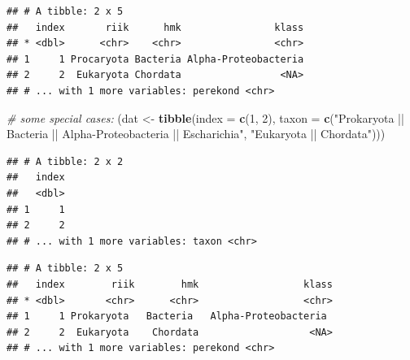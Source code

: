 \documentclass[]{book}
\newenvironment{Shaded}{\begin{snugshade}}{\end{snugshade}}
\newcommand{\KeywordTok}[1]{\textcolor[rgb]{0.13,0.29,0.53}{\textbf{#1}}}
\newcommand{\DataTypeTok}[1]{\textcolor[rgb]{0.13,0.29,0.53}{#1}}
\newcommand{\DecValTok}[1]{\textcolor[rgb]{0.00,0.00,0.81}{#1}}
\newcommand{\CharTok}[1]{\textcolor[rgb]{0.31,0.60,0.02}{#1}}
\newcommand{\StringTok}[1]{\textcolor[rgb]{0.31,0.60,0.02}{#1}}
\newcommand{\CommentTok}[1]{\textcolor[rgb]{0.56,0.35,0.01}{\textit{#1}}}
\newcommand{\OperatorTok}[1]{\textcolor[rgb]{0.81,0.36,0.00}{\textbf{#1}}}
\newcommand{\NormalTok}[1]{#1}
\begin{document}
\begin{verbatim}
## # A tibble: 2 x 5
##   index       riik      hmk                klass
## * <dbl>      <chr>    <chr>                <chr>
## 1     1 Procaryota Bacteria Alpha-Proteobacteria
## 2     2  Eukaryota Chordata                 <NA>
## # ... with 1 more variables: perekond <chr>
\end{verbatim}

\begin{Shaded}
\begin{Highlighting}[]
\CommentTok{# some special cases:}
\NormalTok{(dat <-}\StringTok{ }\KeywordTok{tibble}\NormalTok{(}\DataTypeTok{index =} \KeywordTok{c}\NormalTok{(}\DecValTok{1}\NormalTok{, }\DecValTok{2}\NormalTok{), }
               \DataTypeTok{taxon =} \KeywordTok{c}\NormalTok{(}\StringTok{"Prokaryota || Bacteria || Alpha-Proteobacteria || Escharichia"}\NormalTok{, }\StringTok{"Eukaryota || Chordata"}\NormalTok{)))}
\end{Highlighting}
\end{Shaded}

\begin{verbatim}
## # A tibble: 2 x 2
##   index
##   <dbl>
## 1     1
## 2     2
## # ... with 1 more variables: taxon <chr>
\end{verbatim}

\begin{Shaded}
\end{Shaded}

\begin{verbatim}
## # A tibble: 2 x 5
##   index        riik        hmk                  klass
## * <dbl>       <chr>      <chr>                  <chr>
## 1     1 Prokaryota   Bacteria   Alpha-Proteobacteria 
## 2     2  Eukaryota    Chordata                   <NA>
## # ... with 1 more variables: perekond <chr>
\end{verbatim}
\end{document}
